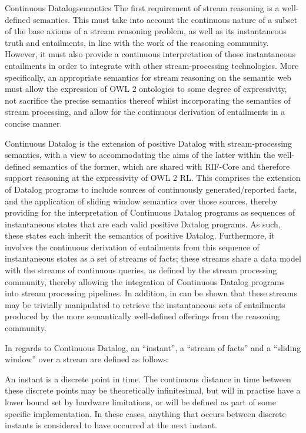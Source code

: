 \begin{nestedsection}{Continuous Datalog}{semantics}
	The first requirement of stream reasoning is a well-defined semantics.
	This must take into account the continuous nature of a subset of the base axioms of a stream reasoning problem, as well as its instantaneous truth and entailments, in line with the work of the reasoning community.
	However, it must also provide a continuous interpretation of those instantaneous entailments in order to integrate with other stream-processing technologies.
	More specifically, an appropriate semantics for stream reasoning on the semantic web must allow the expression of OWL 2 ontologies to some degree of expressivity, not sacrifice the precise semantics thereof whilst incorporating the semantics of stream processing, and allow for the continuous derivation of entailments in a concise manner.

	Continuous Datalog is the extension of positive Datalog with stream-processing semantics, with a view to accommodating the aims of the latter within the well-defined semantics of the former, which are shared with RIF-Core and therefore support reasoning at the expressivity of OWL 2 RL.
	This comprises the extension of Datalog programs to include sources of continuously generated/reported facts, and the application of sliding window semantics over those sources, thereby providing for the interpretation of Continuous Datalog programs as sequences of instantaneous states that are each valid positive Datalog programs.
	As such, these states each inherit the semantics of positive Datalog.
	Furthermore, it involves the continuous derivation of entailments from this sequence of instantaneous states as a set of streams of facts;
	these streams share a data model with the streams of continuous queries, as defined by the stream processing community, thereby allowing the integration of Continuous Datalog programs into stream processing pipelines.
	In addition, in can be shown that these streams may be trivially manipulated to retrieve the instantaneous sets of entailments produced by the more semantically well-defined offerings from the reasoning community.

	In regards to Continuous Datalog, an ``instant'', a ``stream of facts'' and a ``sliding window'' over a stream are defined as follows:

\begin{definition}[Instant]
\label{def:continuous datalog: instant}
An instant is a discrete point in time.  The continuous distance in
time between these discrete points may be theoretically infinitesimal,
but will in practise have a lower bound set by hardware limitations,
or will be defined as part of some specific implementation.  In these
cases, anything that occurs between discrete instants is considered to
have occurred at the next instant.
\end{definition}


\end{nestedsection}
